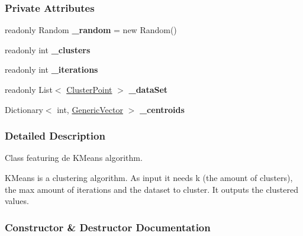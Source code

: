 \subsubsection*{Private Attributes}
\begin{DoxyCompactItemize}
\item 
\mbox{\label{classDataTools_1_1clustering_1_1Kmeans_a0a5c3bc889cf50b80ab55ebed8f57312}} 
readonly Random {\bfseries \+\_\+random} = new Random()
\item 
\mbox{\label{classDataTools_1_1clustering_1_1Kmeans_a554eac85df5a5531150341dc478c63fa}} 
readonly int {\bfseries \+\_\+clusters}
\item 
\mbox{\label{classDataTools_1_1clustering_1_1Kmeans_a430bead482bd81bdb5197d3685bcdd0f}} 
readonly int {\bfseries \+\_\+iterations}
\item 
\mbox{\label{classDataTools_1_1clustering_1_1Kmeans_a91e409ed78afae05248478bc0fb5445b}} 
readonly List$<$ \hyperlink{classDataTools_1_1clustering_1_1ClusterPoint}{Cluster\+Point} $>$ {\bfseries \+\_\+data\+Set}
\item 
\mbox{\label{classDataTools_1_1clustering_1_1Kmeans_a736320ca5ab8246e8923f4c627ca058d}} 
Dictionary$<$ int, \hyperlink{classDataTools_1_1GenericVector}{Generic\+Vector} $>$ {\bfseries \+\_\+centroids}
\end{DoxyCompactItemize}


\subsubsection{Detailed Description}
Class featuring de K\+Means algorithm. 

K\+Means is a clustering algorithm. As input it needs {\ttfamily k} (the amount of clusters), the max amount of iterations and the dataset to cluster. It outputs the clustered values. 

\subsubsection{Constructor \& Destructor Documentation}
\mbox{\label{classDataTools_1_1clustering_1_1Kmeans_a0104b68b82ac185d65d0df9a02569ec8_a0104b68b82ac185d65d0df9a02569ec8}} 
